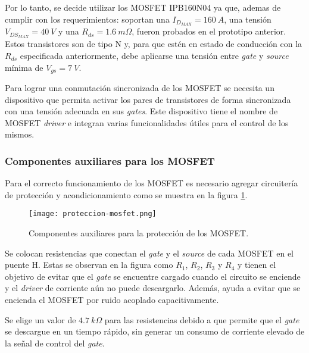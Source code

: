 Por lo tanto, se decide utilizar los MOSFET IPB160N04 \cite{IPB160N04} ya que, ademas de cumplir con los requerimientos: soportan una $I_{D_{MAX}}=160\:A$, una tensión $V_{DS_{MAX}} = 40\:V$ y una $R_{ds} = 1.6 \:m \Omega$, fueron probados en el prototipo anterior. Estos transistores son de tipo N y, para que estén en estado de conducción con la $R_{ds}$ especificada anteriormente, debe aplicarse una tensión entre \textsl{gate} y \textsl{source} mínima de $V_{gs}= 7\:V$.

Para lograr una conmutación sincronizada de los MOSFET se necesita un dispositivo que permita activar los pares de transistores de forma sincronizada con una tensión adecuada en sus \textsl{gates}. Este dispositivo tiene el nombre de MOSFET \textsl{driver} e integran varias funcionalidades útiles para el control de los mismos. 

\subsubsection{Componentes auxiliares para los MOSFET} \label{sec_auxiliares_mosfet}


Para el correcto funcionamiento de los MOSFET es necesario agregar circuitería de protección y acondicionamiento como se muestra en la figura \ref{fig:img_capacitores-puenteH}.


\begin{figure}[H]
	\centering
	\texttt{[image: proteccion-mosfet.png]}
	\caption{Componentes auxiliares para la protección de los MOSFET.}
	\label{fig:img_capacitores-puenteH}
\end{figure}

\label{sec_res-gate}

\noindent Se colocan resistencias que conectan el \textsl{gate} y el \textsl{source} de cada MOSFET en el puente H. Estas se observan en la figura como $R_1$, $R_2$, $R_3$ y $R_4$ y tienen el objetivo de evitar que el \textsl{gate} se encuentre cargado cuando el circuito se enciende y el \textsl{driver} de corriente aún no puede descargarlo. Además, ayuda a evitar que se encienda el MOSFET por ruido acoplado capacitivamente. 

\noindent Se elige un valor de $4.7 \:k\Omega$  para las resistencias debido a que permite que el \textsl{gate} se descargue en un tiempo rápido, sin generar un consumo de corriente elevado de la señal de control del \textsl{gate}.


